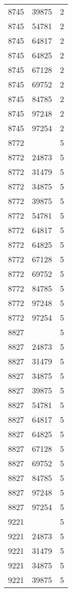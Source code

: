 {{\begin{tabular}{|c|c||c|}
8745&39875&2\\ 8745&54781&2\\ 8745&64817&2\\ 8745&64825&2\\ 8745&67128&2\\ 8745&69752&2\\ 8745&84785&2\\ 8745&97248&2\\ 8745&97254&2\\ 8772& &5\\ 8772&24873&5\\ 8772&31479&5\\ 8772&34875&5\\ 8772&39875&5\\ 8772&54781&5\\ 8772&64817&5\\ 8772&64825&5\\ 8772&67128&5\\ 8772&69752&5\\ 8772&84785&5\\ 8772&97248&5\\ 8772&97254&5\\ 8827& &5\\ 8827&24873&5\\ 8827&31479&5\\ 8827&34875&5\\ 8827&39875&5\\ 8827&54781&5\\ 8827&64817&5\\ 8827&64825&5\\ 8827&67128&5\\ 8827&69752&5\\ 8827&84785&5\\ 8827&97248&5\\ 8827&97254&5\\ 9221& &5\\ 9221&24873&5\\ 9221&31479&5\\ 9221&34875&5\\ 9221&39875&5\\ 
        \hline
        \end{tabular}
    }
}

